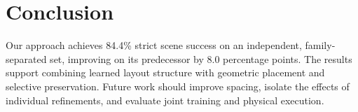 \documentclass{article}
\begin{document}
\section{Conclusion}
Our approach achieves 84.4\% strict scene success on an independent, family-separated set, improving on its predecessor by 8.0 percentage points. The results support combining learned layout structure with geometric placement and selective preservation. Future work should improve spacing, isolate the effects of individual refinements, and evaluate joint training and physical execution.

\begingroup
\small
\raggedright


\endgroup
\clearpage
\appendix

\end{document}
